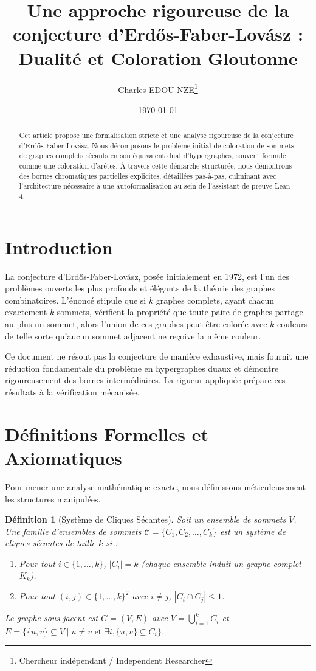 \documentclass[12pt,a4paper]{article}
\title{\textbf{Une approche rigoureuse de la conjecture d'Erdős-Faber-Lovász : Dualité et Coloration Gloutonne}}
\author{Charles EDOU NZE\thanks{Chercheur indépendant / Independent Researcher}}
\date{\today}
\newtheorem{definition}{Définition}
\begin{document}
\maketitle

\begin{abstract}
Cet article propose une formalisation stricte et une analyse rigoureuse de la conjecture d'Erdős-Faber-Lovász. Nous décomposons le problème initial de coloration de sommets de graphes complets sécants en son équivalent dual d'hypergraphes, souvent formulé comme une coloration d'arêtes. À travers cette démarche structurée, nous démontrons des bornes chromatiques partielles explicites, détaillées pas-à-pas, culminant avec l'architecture nécessaire à une autoformalisation au sein de l'assistant de preuve Lean 4.
\end{abstract}

\section{Introduction}
La conjecture d'Erdős-Faber-Lovász, posée initialement en 1972, est l'un des problèmes ouverts les plus profonds et élégants de la théorie des graphes combinatoires.
L'énoncé stipule que si $k$ graphes complets, ayant chacun exactement $k$ sommets, vérifient la propriété que toute paire de graphes partage au plus un sommet, alors l'union de ces graphes peut être colorée avec $k$ couleurs de telle sorte qu'aucun sommet adjacent ne reçoive la même couleur.

Ce document ne résout pas la conjecture de manière exhaustive, mais fournit une réduction fondamentale du problème en hypergraphes duaux et démontre rigoureusement des bornes intermédiaires. La rigueur appliquée prépare ces résultats à la vérification mécanisée.

\section{Définitions Formelles et Axiomatiques}

Pour mener une analyse mathématique exacte, nous définissons méticuleusement les structures manipulées.

\begin{definition}[Système de Cliques Sécantes]
Soit un ensemble de sommets $V$. Une famille d'ensembles de sommets $\mathcal{C} = \{C_1, C_2, \dots, C_k\}$ est un \emph{système de cliques sécantes de taille $k$} si :
\begin{enumerate}
    \item Pour tout $i \in \{1, \dots, k\}$, $|C_i| = k$ (chaque ensemble induit un graphe complet $K_k$).
    \item Pour tout $(i, j) \in \{1, \dots, k\}^2$ avec $i \neq j$, $|C_i \cap C_j| \le 1$.
\end{enumerate}
Le graphe sous-jacent est $G = (V, E)$ avec $V = \bigcup_{i=1}^k C_i$ et $E = \{\{u, v\} \subseteq V \mid u \neq v \text{ et } \exists i, \{u, v\} \subseteq C_i \}$.
\end{definition}
\end{document}
